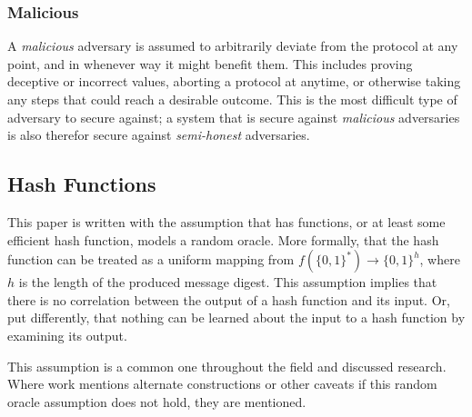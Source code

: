 \subsubsection{Malicious}

A \emph{malicious} adversary is assumed to arbitrarily deviate from the protocol at any point, and in whenever way it might benefit them\cite{goldreich1998secure}.  This includes proving deceptive or incorrect values, aborting a protocol at anytime, or otherwise taking any steps that could reach a desirable outcome.  This is the most difficult type of adversary to secure against; a system that is secure against \emph{malicious} adversaries is also therefor secure against \emph{semi-honest} adversaries.


\subsection{Hash Functions}

This paper is written with the assumption that has functions, or at least some efficient hash function, models a random oracle.  More formally, that the hash function can be treated as a uniform mapping from $f(\{0, 1\}^{*}) \to \{0, 1\}^{h}$, where $h$ is the length of the produced message digest.  This assumption implies that there is no correlation between the output of a hash function and its input.  Or, put differently, that nothing can be learned about the input to a hash function by examining its output.

This assumption is a common one throughout the field and discussed research\cite{pinkas2009secure}.  Where work mentions alternate constructions or other caveats if this random oracle assumption does not hold, they are mentioned.
